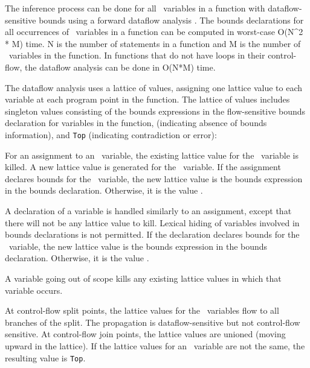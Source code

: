 The inference process can be done for all \arrayptr\ variables
in a function with dataflow-sensitive bounds using a forward dataflow
analysis \cite{Aho2007}. The bounds declarations for all occurrences of
\arrayptr\ variables in a function can be computed in
worst-case O(N\^{}2 * M) time. N is the number of statements in a
function and M is the number of \arrayptr\ variables in the
function. In functions that do not have loops in their control-flow, the
dataflow analysis can be done in O(N*M) time.

The dataflow analysis uses a lattice of values, assigning one lattice
value to each variable at each program point in the function. The
lattice of values includes singleton values consisting of the bounds
expressions in the flow-sensitive bounds declaration for variables in
the function, \boundsnone (indicating absence of bounds
information), and \texttt{Top} (indicating contradiction or error):

 
For an assignment to an \arrayptr\ variable, the existing
lattice value for the \arrayptr\ variable is killed. A new
lattice value is generated for the \arrayptr\ variable. If the
assignment declares bounds for the \arrayptr\ variable, the new
lattice value is the bounds expression in the bounds declaration.
Otherwise, it is the value \boundsnone.

A declaration of a variable is handled similarly to an assignment,
except that there will not be any lattice value to kill. Lexical hiding
of variables involved in bounds declarations is not permitted. If the
declaration declares bounds for the \arrayptr\ variable, the
new lattice value is the bounds expression in the bounds declaration.
Otherwise, it is the value \boundsnone.

A variable going out of scope kills any existing lattice values in which
that variable occurs.

At control-flow split points, the lattice values for the
\arrayptr\ variables flow to all branches of the split. The
propagation is dataflow-sensitive but not control-flow sensitive. At
control-flow join points, the lattice values are unioned (moving upward
in the lattice). If the lattice values for an \arrayptr\
variable are not the same, the resulting value is \texttt{Top}.

